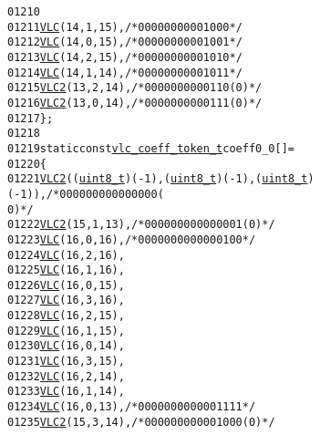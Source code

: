 \begin{footnotesize}
\begin{alltt}
01210 
01211         \hyperlink{vlc_8h_a7f3572774a720fd9b4bc3b1a0b65082f}{VLC}(14, 1, 15),   \textcolor{comment}{/* 0000 0000 0010 00 */}
01212         \hyperlink{vlc_8h_a7f3572774a720fd9b4bc3b1a0b65082f}{VLC}(14, 0, 15),   \textcolor{comment}{/* 0000 0000 0010 01 */}
01213         \hyperlink{vlc_8h_a7f3572774a720fd9b4bc3b1a0b65082f}{VLC}(14, 2, 15),   \textcolor{comment}{/* 0000 0000 0010 10 */}
01214         \hyperlink{vlc_8h_a7f3572774a720fd9b4bc3b1a0b65082f}{VLC}(14, 1, 14),   \textcolor{comment}{/* 0000 0000 0010 11 */}
01215         \hyperlink{vlc_8h_ad3cda36b9c6132357c7f7de5e52a6c93}{VLC2}(13, 2, 14),   \textcolor{comment}{/* 0000 0000 0011 0(0) */}
01216         \hyperlink{vlc_8h_ad3cda36b9c6132357c7f7de5e52a6c93}{VLC2}(13, 0, 14),   \textcolor{comment}{/* 0000 0000 0011 1(0) */}
01217 \};
01218 
01219 \textcolor{keyword}{static} \textcolor{keyword}{const} \hyperlink{structvlc__coeff__token__t}{vlc_coeff_token_t} coeff0\_0[] = 
01220 \{
01221         \hyperlink{vlc_8h_ad3cda36b9c6132357c7f7de5e52a6c93}{VLC2}((\hyperlink{_types_8h_a363e4d606232036a6b89060813c45489}{uint8_t})(-1), (\hyperlink{_types_8h_a363e4d606232036a6b89060813c45489}{uint8_t})(-1), (\hyperlink{_types_8h_a363e4d606232036a6b89060813c45489}{uint8_t})(-1)), \textcolor{comment}{/* 0000 0000 0000 000(
      0) */}
01222         \hyperlink{vlc_8h_ad3cda36b9c6132357c7f7de5e52a6c93}{VLC2}(15, 1, 13),  \textcolor{comment}{/* 0000 0000 0000 001(0) */}
01223         \hyperlink{vlc_8h_a7f3572774a720fd9b4bc3b1a0b65082f}{VLC}(16, 0, 16),   \textcolor{comment}{/* 0000 0000 0000 0100 */}
01224         \hyperlink{vlc_8h_a7f3572774a720fd9b4bc3b1a0b65082f}{VLC}(16, 2, 16),   
01225         \hyperlink{vlc_8h_a7f3572774a720fd9b4bc3b1a0b65082f}{VLC}(16, 1, 16),
01226         \hyperlink{vlc_8h_a7f3572774a720fd9b4bc3b1a0b65082f}{VLC}(16, 0, 15),
01227         \hyperlink{vlc_8h_a7f3572774a720fd9b4bc3b1a0b65082f}{VLC}(16, 3, 16),
01228         \hyperlink{vlc_8h_a7f3572774a720fd9b4bc3b1a0b65082f}{VLC}(16, 2, 15),
01229         \hyperlink{vlc_8h_a7f3572774a720fd9b4bc3b1a0b65082f}{VLC}(16, 1, 15),
01230         \hyperlink{vlc_8h_a7f3572774a720fd9b4bc3b1a0b65082f}{VLC}(16, 0, 14),
01231         \hyperlink{vlc_8h_a7f3572774a720fd9b4bc3b1a0b65082f}{VLC}(16, 3, 15),
01232         \hyperlink{vlc_8h_a7f3572774a720fd9b4bc3b1a0b65082f}{VLC}(16, 2, 14),
01233         \hyperlink{vlc_8h_a7f3572774a720fd9b4bc3b1a0b65082f}{VLC}(16, 1, 14),
01234         \hyperlink{vlc_8h_a7f3572774a720fd9b4bc3b1a0b65082f}{VLC}(16, 0, 13),   \textcolor{comment}{/* 0000 0000 0000 1111 */}
01235         \hyperlink{vlc_8h_ad3cda36b9c6132357c7f7de5e52a6c93}{VLC2}(15, 3, 14),  \textcolor{comment}{/* 0000 0000 0001 000(0) */}

\end{alltt}
\end{footnotesize}
